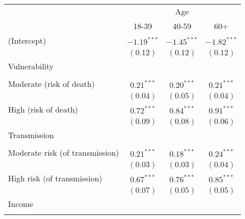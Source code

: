 
\begin{table}
\begin{center}
\begin{scriptsize}
\begin{tabular}{l c c c}
\hline
 & \multicolumn{3}{c}{Age} \\
\cline{2-4}
 & 18-39 & 40-59 & 60+ \\
\hline
(Intercept)                                     & $-1.19^{***}$ & $-1.45^{***}$ & $-1.82^{***}$ \\
                                                & $(0.12)$      & $(0.12)$      & $(0.12)$      \\
Vulnerability                                   &               &               &               \\
                                                &               &               &               \\
\quad Moderate (risk of death)                  & $0.21^{***}$  & $0.20^{***}$  & $0.21^{***}$  \\
                                                & $(0.04)$      & $(0.05)$      & $(0.04)$      \\
\quad High (risk of death)                      & $0.72^{***}$  & $0.84^{***}$  & $0.91^{***}$  \\
                                                & $(0.09)$      & $(0.08)$      & $(0.06)$      \\
Transmission                                    &               &               &               \\
                                                &               &               &               \\
\quad Moderate risk (of transmission)           & $0.21^{***}$  & $0.18^{***}$  & $0.24^{***}$  \\
                                                & $(0.03)$      & $(0.03)$      & $(0.04)$      \\
\quad High risk (of transmission)               & $0.67^{***}$  & $0.76^{***}$  & $0.85^{***}$  \\
                                                & $(0.07)$      & $(0.05)$      & $(0.05)$      \\
Income                                          &               &               &               \\
                                                &               &               &               \\

\end{tabular}
\end{scriptsize}
\end{center}
\end{table}
